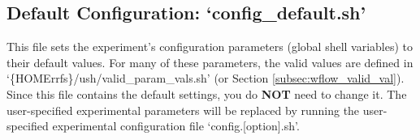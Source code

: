 \documentclass[11pt,fleqn]{report}              %
\begin{document}
\subsection{Default Configuration: `config\_default.sh'}
\label{subsec:wflow_config_default}

This file sets the experiment's configuration parameters (global shell variables) to their default values. For many of these parameters, the valid values are defined in `\{HOMErrfs\}/ush/valid\_param\_vals.sh' (or Section \ref{subsec:wflow_valid_val}). Since this file contains the default settings, you do {\bf NOT} need to change it. The user-specified experimental parameters will be replaced by running the user-specified experimental configuration file `config.[option].sh'.
\end{document}
